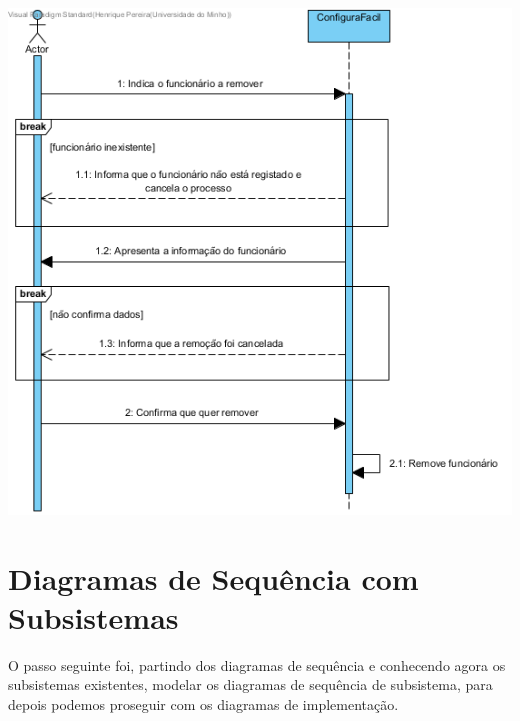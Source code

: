 \documentclass[11pt]{article} %
\begin{document}
\begin{enumerate}
\begin{center}
 			\includegraphics[width = 6in]{dss_remover_funcionario.png}
		\end{center}
\end{enumerate}

\section{Diagramas de Sequência com Subsistemas}
O passo seguinte foi, partindo dos diagramas de sequência e conhecendo agora os subsistemas existentes, modelar os diagramas de sequência de subsistema, para depois podemos proseguir com os diagramas de implementação.
\end{document}

